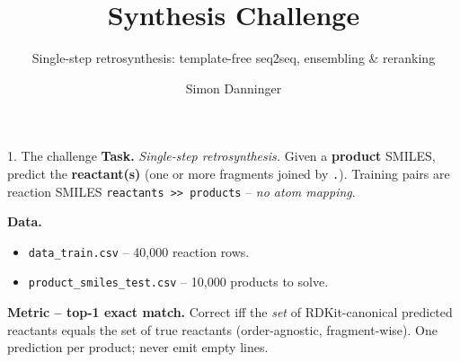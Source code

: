 \documentclass[aspectratio=169,11pt]{beamer}
\title{Synthesis Challenge}
\subtitle{Single-step retrosynthesis: template-free seq2seq, ensembling \& reranking}
\author{Simon Danninger}
\institute{JKU Linz -- AI in Life Sciences}
\date{}
\begin{document}
\begin{frame}
  \titlepage
\end{frame}

\begin{frame}{1. The challenge}
  \textbf{Task.} \emph{Single-step retrosynthesis.} Given a \textbf{product}
  SMILES, predict the \textbf{reactant(s)} (one or more fragments joined by
  \texttt{.}). Training pairs are reaction SMILES
  \texttt{reactants >> products} -- \emph{no atom mapping}.

  \medskip
  \textbf{Data.}
  \begin{itemize}
    \item \texttt{data\_train.csv} -- 40{,}000 reaction rows.
    \item \texttt{product\_smiles\_test.csv} -- 10{,}000 products to solve.
  \end{itemize}

  \medskip
  \textbf{Metric -- top-1 exact match.} Correct iff the \emph{set} of
  RDKit-canonical predicted reactants equals the set of true reactants
  (order-agnostic, fragment-wise). One prediction per product; never emit
  empty lines.
\end{frame}
\end{document}
